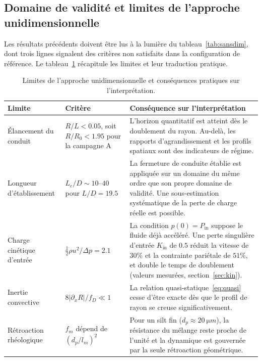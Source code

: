 \documentclass[11pt,a4paper]{report}
\newcommand{\kin}{K_{\mathrm{in}}}
\begin{document}
\subsection{Domaine de validité et limites de l'approche unidimensionnelle}
\label{sec:validite}

Les résultats précédents doivent être lus à la lumière du tableau~\ref{tab:sansdim}, dont trois lignes
signalent des critères non satisfaits dans la configuration de référence. Le tableau~\ref{tab:validite}
récapitule les limites et leur traduction pratique.

\begin{table}[H]
\centering
\caption{Limites de l'approche unidimensionnelle et conséquences pratiques sur l'interprétation.}
\label{tab:validite}
\small
\begin{tabular}{p{3.4cm}p{4.6cm}p{5.6cm}}
\toprule
Limite & Critère & Conséquence sur l'interprétation \\
\midrule
Élancement du conduit & \(R/L < 0.05\), soit \(R/R_0 < 1.95\) pour la campagne A &
L'horizon quantitatif est atteint dès le doublement du rayon. Au-delà, les rapports d'agrandissement et
les profils spatiaux sont des indicateurs de régime. \\[1mm]
Longueur d'établissement & \(L_e/D \sim 10\)--\(40\) pour \(L/D = 19.5\) &
La fermeture de conduite établie est appliquée sur un domaine du même ordre que son propre domaine de
validité. Une sous-estimation systématique de la perte de charge réelle est possible. \\[1mm]
Charge cinétique d'entrée & \(\frac{1}{2}\rho u^2/\Delta p = 2.1\) &
La condition \(p(0) = P_{\mathrm{in}}\) suppose le fluide déjà accéléré. Une perte singulière d'entrée
\(\kin\) de \(0.5\) réduit la vitesse de \(30\%\) et la contrainte pariétale de \(51\%\), et double le
temps de doublement (valeurs mesurées, section~\ref{sec:kin}). \\[1mm]
Inertie convective & \(8|\partial_xR|/f_D \ll 1\) &
La relation quasi-statique~\eqref{eq:quasi} cesse d'être exacte dès que le profil de rayon se creuse
significativement. \\[1mm]
Rétroaction rhéologique & \(f_m\) dépend de \((d_p/l_m)^2\) &
Pour un silt fin (\(d_p \approx 20\ \si{\micro m}\)), la résistance du mélange reste proche de l'unité et
la dynamique est gouvernée par la seule rétroaction géométrique. \\
\bottomrule
\end{tabular}
\end{table}
\end{document}
